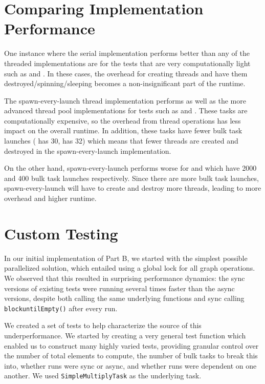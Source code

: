\documentclass[11pt]{article}
\begin{document}
\section{Comparing Implementation Performance}

One instance where the serial implementation performs better than any of the
threaded implementations are for the tests that are very computationally light
such as  and . In these cases, the
overhead for creating threads and have them destroyed/spinning/sleeping becomes
a non-insignificant part of the runtime.

\medskip
The spawn-every-launch thread implementation performs as well as the more
advanced thread pool implementations for tests such as
 and
. These tasks are computationally expensive, so the
overhead from thread operations has less impact on the overall runtime. In
addition, these tasks have fewer bulk task launches (
has 30,  has 32)
which means that fewer threads are created and destroyed in the
spawn-every-launch implementation.

\smallskip
On the other hand, spawn-every-launch performs worse for
 and  which
have 2000 and 400 bulk task launches respectively. Since there are more bulk
task launches, spawn-every-launch will have to create and destroy more threads,
leading to more overhead and higher runtime.

\section{Custom Testing}

In our initial implementation of Part B, we started with the simplest possible
parallelized solution, which entailed using a global lock for all graph
operations. We observed that this resulted in surprising performance dynamics:
the sync versions of existing tests were running several times faster than the
async versions, despite both calling the same underlying functions and sync
calling \verb|blockuntilEmpty()| after every run.

\medskip
We created a set of tests to help characterize the source of this
underperformance. We started by creating a very general test function which
enabled us to construct many highly varied tests, providing granular control
over the number of total elements to compute, the number of bulk tasks to break
this into, whether runs were sync or async, and whether runs were dependent on
one another. We used \verb|SimpleMultiplyTask| as the underlying task.
\end{document}
